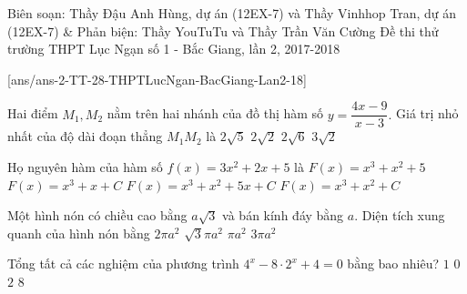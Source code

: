 \begin{name}
{Biên soạn: Thầy Đậu Anh Hùng, dự án (12EX-7) và Thầy Vinhhop Tran, dự án (12EX-7) \& Phản biện: Thầy YouTuTu và Thầy Trần Văn Cường}
{Đề thi thử trường THPT Lục Ngạn số 1 - Bắc Giang, lần 2, 2017-2018}
\end{name}

\setcounter{ex}{0}\setcounter{bt}{0}
[ans/ans-2-TT-28-THPTLucNgan-BacGiang-Lan2-18]
\begin{ex}%
Hai điểm $M_1,M_2$ nằm trên hai nhánh của đồ thị hàm số $y=\dfrac{4x-9}{x-3}.$ Giá trị nhỏ nhất của độ dài đoạn thẳng $M_1M_2$ là
\choice
{$2\sqrt5$}
{$2\sqrt2$}
{\True $2\sqrt6$}
{$3\sqrt2$}
\end{ex}

\begin{ex}%
Họ nguyên hàm của hàm số $f(x)=3x^2+2x+5$ là
\choice
{$F(x)=x^3+x^2+5$}
{$F(x)=x^3+x+C$}
{\True $F(x)=x^3+x^2+5x+C$}
{$F(x)=x^3+x^2+C$}
\end{ex}

\begin{ex}%
Một hình nón có chiều cao bằng $a\sqrt3$ và bán kính đáy bằng $a$. Diện tích xung quanh của hình nón bằng
\choice
{\True $2\pi a^2$}
{$\sqrt3\pi a^2$}
{$\pi a^2$}
{$3\pi a^2$}
\end{ex}

\begin{ex}%
Tổng tất cả các nghiệm của phương trình $4^x-8\cdot 2^x+4=0$ bằng bao nhiêu?
\choice
{$1$}
{$0$}
{\True $2$}
{$8$}
\end{ex}

